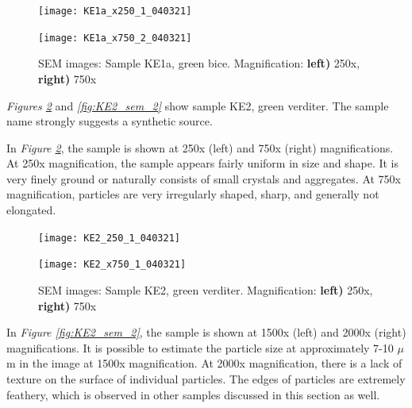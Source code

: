 \begin{figure}[H]
\centering
\begin{minipage}{.45\textwidth}
  \centering
  \texttt{[image: KE1a\_x250\_1\_040321]}
\end{minipage}
\begin{minipage}{.45\textwidth}
  \centering
  \texttt{[image: KE1a\_x750\_2\_040321]}
\end{minipage}
\caption[SEM images: Sample KE1a, green bice]{SEM images: Sample KE1a, green bice. Magnification: \textbf{left)} 250x, \textbf{right)} 750x}
\label{fig:KE1a_sem_1}
\end{figure}




\textit{Figures \ref{fig:KE2_sem_1}} and \textit{\ref{fig:KE2_sem_2}} show sample KE2, green verditer. The sample name strongly suggests a synthetic source. 

In \textit{Figure \ref{fig:KE2_sem_1}}, the sample is shown at 250x (left) and 750x (right) magnifications. At 250x magnification, the sample appears fairly uniform in size and shape. It is very finely ground or naturally consists of small crystals and aggregates. At 750x magnification, particles are very irregularly shaped, sharp, and generally not elongated.

\begin{figure}[H]
\centering
\begin{minipage}{.45\textwidth}
  \centering
  \texttt{[image: KE2\_250\_1\_040321]}
\end{minipage}
\begin{minipage}{.45\textwidth}
  \centering
  \texttt{[image: KE2\_x750\_1\_040321]}
\end{minipage}
\caption[SEM images: Sample KE2, green verditer]{SEM images: Sample KE2, green verditer. Magnification: \textbf{left)} 250x, \textbf{right)} 750x}
\label{fig:KE2_sem_1}
\end{figure}

In \textit{Figure \ref{fig:KE2_sem_2}}, the sample is shown at 1500x (left) and 2000x (right) magnifications. It is possible to estimate the particle size at approximately 7-10 $\mu$m in the image at 1500x magnification. At 2000x magnification, there is a lack of texture on the surface of individual particles. The edges of particles are extremely feathery, which is observed in other samples discussed in this section as well.

